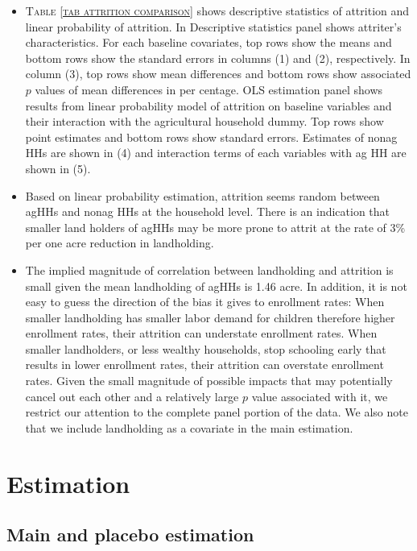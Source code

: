 \begin{itemize}
\vspace{1.0ex}\setlength{\itemsep}{1.0ex}\setlength{\baselineskip}{12pt}
\item	\textsc{\normalsize Table \ref{tab attrition comparison}} shows descriptive statistics of attrition and linear probability of attrition. In \textsf{Descriptive statistics} panel shows attriter's characteristics. For each baseline covariates, top rows show the means and bottom rows show the standard errors in columns (1) and (2), respectively. In column (3), top rows show mean differences and bottom rows show associated $p$ values of mean differences in per centage. \textsf{OLS estimation} panel shows results from linear probability model of attrition on baseline variables and their interaction with the agricultural household dummy. Top rows show point estimates and bottom rows show standard errors. Estimates of nonag HHs are shown in (4) and interaction terms of each variables with ag HH are shown in (5). 
\item	Based on linear probability estimation, attrition seems random between agHHs and nonag HHs at the household level. There is an indication that smaller land holders of agHHs may be more prone to attrit at the rate of 3\% per one acre reduction in landholding. 
\item	The implied magnitude of correlation between landholding and attrition is small given the mean landholding of agHHs is 1.46 acre. In addition, it is not easy to guess the direction of the bias it gives to enrollment rates: When smaller landholding has smaller labor demand for children therefore higher enrollment rates, their attrition can understate enrollment rates. When smaller landholders, or less wealthy households, stop schooling early that results in lower enrollment rates, their attrition can overstate enrollment rates. Given the small magnitude of possible impacts that may potentially cancel out each other and a relatively large $p$ value associated with it, we restrict our attention to the complete panel portion of the data. We also note that we include landholding as a covariate in the main estimation.
\end{itemize}



\section{Estimation}

\subsection{Main and placebo estimation}

